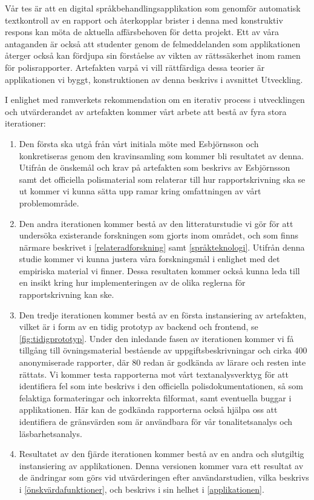 \documentclass[swedish]{maucsthesis}
\begin{document}
Vår tes är att en digital språkbehandlingsapplikation som genomför automatisk
textkontroll av en rapport och återkopplar brister i denna med konstruktiv
respons kan möta de aktuella affärsbehoven för detta projekt. Ett av våra
antaganden är också att studenter genom de felmeddelanden som applikationen
återger också kan fördjupa sin förståelse av vikten av rättssäkerhet inom ramen
för polisrapporter. Artefakten varpå vi vill rättfärdiga dessa teorier är
applikationen vi byggt, konstruktionen av denna beskrivs i avsnittet Utveckling.

I enlighet med ramverkets rekommendation om en iterativ process i utvecklingen och utvärderandet av artefakten kommer vårt arbete att bestå av fyra stora iterationer:

\begin{enumerate}
\item Den första ska utgå från vårt initiala möte med Esbjörnsson och konkretiseras genom den kravinsamling som kommer bli resultatet av denna.
  Utifrån de önskemål och krav på artefakten som beskrivs av Esbjörnsson samt det
  officiella polismaterial som relaterar till hur rapportskrivning ska se ut
  kommer vi kunna sätta upp ramar kring omfattningen av vårt problemområde.
\item Den andra iterationen kommer bestå av den litteraturstudie vi gör för att undersöka existerande forskningen som gjorts inom området, och som finns
  närmare beskrivet i \cref{relateradforskning} samt \cref{språkteknologi}.
  Utifrån denna studie kommer vi kunna justera våra forskningsmål i enlighet med det
  empiriska material vi finner. Dessa resultaten kommer också kunna leda till en insikt kring
  hur implementeringen av de olika reglerna för rapportskrivning kan ske.
\item Den tredje iterationen kommer bestå av en första instansiering av artefakten, vilket är i form av en tidig prototyp av backend och frontend, se
  \cref{fig:tidigprototyp}. Under den inledande fasen av iterationen kommer vi få tillgång till övningsmaterial bestående av uppgiftsbeskrivningar och cirka
  400 anonymiserade rapporter, där 80 redan är godkända av lärare och resten inte rättats. Vi kommer testa rapporterna mot vårt textanalysverktyg för
  att identifiera fel som inte beskrivs i den officiella polisdokumentationen,
  så som felaktiga formateringar och inkorrekta filformat, samt eventuella
  buggar i applikationen. Här kan de godkända rapporterna också hjälpa oss att
  identifiera de gränsvärden som är användbara för vår tonalitetsanalys och
  läsbarhetsanalys.
\item Resultatet av den fjärde iterationen kommer bestå av en andra och slutgiltig
  instansiering av applikationen. Denna versionen kommer vara ett resultat av de
  ändringar som görs vid utvärderingen efter användarstudien, vilka beskrivs i
  \cref{önskvärdafunktioner}, och beskrivs i sin helhet i
  \cref{applikationen}.
\end{enumerate}
\end{document}

